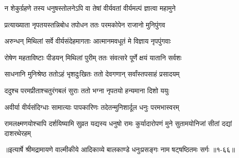 \twolineshloka
{न शेकुर्ग्रहणे तस्य धनुषस्तोलनेऽपि वा}
{तेषां वीर्यवतां वीर्यमल्पं ज्ञात्वा महामुने} %

\twolineshloka
{प्रत्याख्याता नृपतयस्तन्निबोध तपोधन}
{ततः परमकोपेन राजानो मुनिपुंगव} %

\twolineshloka
{अरुन्धन् मिथिलां सर्वे वीर्यसंदेहमागताः}
{आत्मानमवधूतं मे विज्ञाय नृपपुंगवाः} %

\twolineshloka
{रोषेण महताविष्टाः पीडयन् मिथिलां पुरीम्}
{ततः संवत्सरे पूर्णे क्षयं यातानि सर्वशः} %

\twolineshloka
{साधनानि मुनिश्रेष्ठ ततोऽहं भृशदुःखितः}
{ततो देवगणान् सर्वांस्तपसाहं प्रसादयम्} %

\twolineshloka
{ददुश्च परमप्रीताश्चतुरंगबलं सुराः}
{ततो भग्ना नृपतयो हन्यमाना दिशो ययुः} %

\twolineshloka
{अवीर्या वीर्यसंदिग्धाः सामात्याः पापकारिणः}
{तदेतन्मुनिशार्दूल धनुः परमभास्वरम्} %

\threelineshloka
{रामलक्ष्मणयोश्चापि दर्शयिष्यामि सुव्रत}
{यद्यस्य धनुषो रामः कुर्यादारोपणं मुने}
{सुतामयोनिजां सीतां दद्यां दाशरथेरहम्} %


॥इत्यार्षे श्रीमद्रामायणे वाल्मीकीये आदिकाव्ये बालकाण्डे धनुःप्रसङ्गः नाम षट्षष्ठितमः सर्गः ॥१-६६॥
